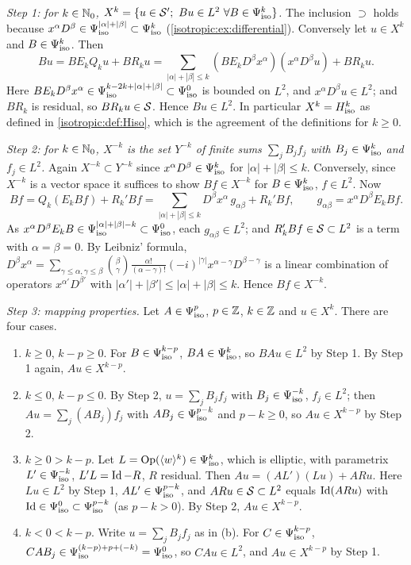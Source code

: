 \emph{Step 1: for $k\in\mathbb{N}_0$, $X^k=\{u\in\mathcal{S}';\ Bu\in L^2\ \forall B\in\Psi^{k}_{\mathrm{iso}}\}$.}
The inclusion $\supset$ holds because $x^\alpha D^\beta\in\Psi^{|\alpha|+|\beta|}_{\mathrm{iso}}\subset\Psi^{k}_{\mathrm{iso}}$
(\cref{isotropic:ex:differential}). Conversely let $u\in X^k$ and
$B\in\Psi^{k}_{\mathrm{iso}}$. Then
\begin{equation*}
  Bu=BE_kQ_ku+BR_ku=\sum_{|\alpha|+|\beta|\le k}(BE_kD^\beta x^\alpha)(x^\alpha D^\beta u)+BR_ku .
\end{equation*}
Here $BE_kD^\beta x^\alpha\in\Psi^{k-2k+|\alpha|+|\beta|}_{\mathrm{iso}}\subset\Psi^{0}_{\mathrm{iso}}$ is
bounded on $L^2$, and $x^\alpha D^\beta u\in L^2$; and $BR_k$ is residual, so
$BR_ku\in\mathcal{S}$. Hence $Bu\in L^2$. In particular $X^k=H^{k}_{\mathrm{iso}}$ as defined in
\cref{isotropic:def:Hiso}, which is the agreement of the definitions for
$k\ge0$.

\emph{Step 2: for $k\in\mathbb{N}_0$, $X^{-k}$ is the set $Y^{-k}$ of finite sums
$\sum_jB_jf_j$ with $B_j\in\Psi^{k}_{\mathrm{iso}}$ and $f_j\in L^2$.} Again $X^{-k}\subset Y^{-k}$
since $x^\alpha D^\beta\in\Psi^{k}_{\mathrm{iso}}$ for $|\alpha|+|\beta|\le k$. Conversely,
since $X^{-k}$ is a vector space it suffices to show $Bf\in X^{-k}$ for
$B\in\Psi^{k}_{\mathrm{iso}}$, $f\in L^2$. Now
\begin{equation*}
  Bf=Q_k(E_kBf)+R_k'Bf=\sum_{|\alpha|+|\beta|\le k}D^\beta x^\alpha\,g_{\alpha\beta}+R_k'Bf,
  \qquad g_{\alpha\beta}=x^\alpha D^\beta E_kBf .
\end{equation*}
As $x^\alpha D^\beta E_kB\in\Psi^{|\alpha|+|\beta|-k}_{\mathrm{iso}}\subset\Psi^{0}_{\mathrm{iso}}$, each
$g_{\alpha\beta}\in L^2$; and $R_k'Bf\in\mathcal{S}\subset L^2$ is a term with
$\alpha=\beta=0$. By Leibniz' formula,
$D^\beta x^\alpha=\sum_{\gamma\le\alpha,\gamma\le\beta}\binom\beta\gamma\frac{\alpha!}{(\alpha-\gamma)!}(-i)^{|\gamma|}x^{\alpha-\gamma}D^{\beta-\gamma}$
is a linear combination of operators $x^{\alpha'}D^{\beta'}$ with
$|\alpha'|+|\beta'|\le|\alpha|+|\beta|\le k$. Hence $Bf\in X^{-k}$.

\emph{Step 3: mapping properties.} Let $A\in\Psi^{p}_{\mathrm{iso}}$, $p\in\mathbb{Z}$, $k\in\mathbb{Z}$
and $u\in X^k$. There are four cases.
\begin{enumerate}[label=(\alph*)]
\item $k\ge0$, $k-p\ge0$. For $B\in\Psi^{k-p}_{\mathrm{iso}}$, $BA\in\Psi^{k}_{\mathrm{iso}}$, so
  $BAu\in L^2$ by Step 1. By Step 1 again, $Au\in X^{k-p}$.
\item $k\le0$, $k-p\le0$. By Step 2, $u=\sum_jB_jf_j$ with $B_j\in\Psi^{-k}_{\mathrm{iso}}$,
  $f_j\in L^2$; then $Au=\sum_j(AB_j)f_j$ with $AB_j\in\Psi^{p-k}_{\mathrm{iso}}$ and
  $p-k\ge0$, so $Au\in X^{k-p}$ by Step 2.
\item $k\ge0>k-p$. Let $L=\operatorname{Op}(\langle w\rangle^k)\in\Psi^{k}_{\mathrm{iso}}$, which is elliptic, with
  parametrix $L'\in\Psi^{-k}_{\mathrm{iso}}$, $L'L=\operatorname{Id}-R$, $R$ residual. Then
  $Au=(AL')(Lu)+ARu$. Here $Lu\in L^2$ by Step 1, $AL'\in\Psi^{p-k}_{\mathrm{iso}}$, and
  $ARu\in\mathcal{S}\subset L^2$ equals $\operatorname{Id}(ARu)$ with $\operatorname{Id}\in\Psi^{0}_{\mathrm{iso}}\subset\Psi^{p-k}_{\mathrm{iso}}$
  (as $p-k>0$). By Step 2, $Au\in X^{k-p}$.
\item $k<0<k-p$. Write $u=\sum_jB_jf_j$ as in (b). For $C\in\Psi^{k-p}_{\mathrm{iso}}$,
  $CAB_j\in\Psi^{(k-p)+p+(-k)}_{\mathrm{iso}}=\Psi^{0}_{\mathrm{iso}}$, so $CAu\in L^2$, and $Au\in X^{k-p}$
  by Step 1.
\end{enumerate}

